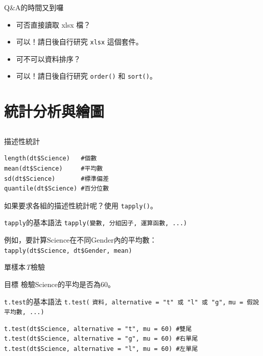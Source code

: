 \documentclass[12pt, aspectratio=43]{beamer}
\begin{document}
\begin{frame}[fragile]{Q\&A的時間又到囉}
\begin{itemize}
\item[Q] 可否直接讀取 xlsx 檔？\\
\item[A] 可以！請日後自行研究 \verb+xlsx+ 這個套件。
\end{itemize}
\begin{itemize}
\item[Q] 可不可以資料排序？\\
\item[A] 可以！請日後自行研究 \verb+order()+ 和 \verb+sort()+。
\end{itemize}
\end{frame}


\section{統計分析與繪圖}\subsection{}

\begin{frame}[fragile]{描述性統計}
\begin{verbatim}
length(dt$Science)   #個數
mean(dt$Science)     #平均數
sd(dt$Science)       #標準偏差
quantile(dt$Science) #百分位數
\end{verbatim}

如果要求各組的描述性統計呢？使用 \verb+tapply()+。
\begin{block}{\texttt{tapply}的基本語法}
\verb+tapply(變數, 分組因子, 運算函數, ...)+
\end{block}
例如，要計算Science在不同Gender內的平均數：\\
\verb+tapply(dt$Science, dt$Gender, mean)+\\
\end{frame}

\begin{frame}[fragile]{單樣本\emph{T}檢驗}

\begin{block}{目標}
檢驗Science的平均是否為60。
\end{block}
\begin{block}{\texttt{t.test}的基本語法}
\verb+t.test(+
  \verb+資料, alternative = "t" 或 "l" 或 "g",+
  \verb+mu = 假說平均數, ...)+
\end{block}
\begin{verbatim}
t.test(dt$Science, alternative = "t", mu = 60) #雙尾
t.test(dt$Science, alternative = "g", mu = 60) #右單尾
t.test(dt$Science, alternative = "l", mu = 60) #左單尾
\end{verbatim}
\end{frame}
\end{document}
